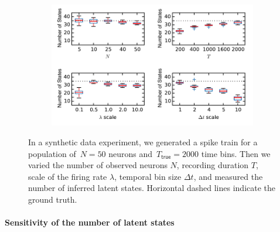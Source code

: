 \begin{figure}  
  \centering
  \begin{subfigure}[t]{5in}
    \includegraphics[width=\textwidth]{figures/ch5/Fig3_old.pdf}
  \end{subfigure}
  \caption[Inferred parameters of the HDP-HMM for synthetic data]{In a
    synthetic data experiment, we generated a spike train for a
    population of~$N=50$ neurons
    and~$T_{\textsf{true}}=2000$ time bins. Then we varied the number
    of observed neurons $N$, recording duration $T$, scale of the firing
    rate $\lambda$, temporal bin size $\Delta t$, and measured the
    number of inferred latent states. Horizontal dashed lines indicate
    the ground truth.}
  \label{fig3}
\end{figure}


\paragraph{Sensitivity of the number of latent states} 


